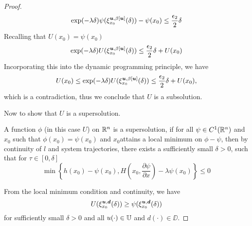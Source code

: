 \begin{for_journal}
\begin{proof}
%
\begin{equation}
\exp(-\lambda \delta)\psi(\xi_{x_0}^{\bm{u},\beta[\bm{u}]}(\delta))-\psi(x_0) \leq \frac{\epsilon_2}{2} \delta
\end{equation}
%
Recalling that $U(x_0)=\psi(x_0)$
%
\begin{equation}
\exp(-\lambda \delta)U(\xi_{x_0}^{\bm{u},\beta[\bm{u}]}(\delta)) \leq \frac{\epsilon_2}{2} \delta + U(x_0)
\end{equation}
%
Incorporating this into the dynamic programming principle, we have
%
\begin{equation}
U(x_0) \leq \exp(-\lambda \delta)U(\xi_{x_0}^{\bm{u},\beta[\bm{u}]}(\delta)) \leq \frac{\epsilon_2}{2} \delta + U(x_0),
\end{equation}
%
which is a contradiction, thus we conclude that $U$ is a subsolution.


Now to show that $U$ is a supersolution. 

\begin{definition} A function $\phi$ (in this case $U$) on $\mathbb{R}^n$  is a supersolution, if for all $\psi \in C^1(\mathbb{R}^n)$ and $x_0$ such that $\phi(x_0) = \psi(x_0)$ and $x_0$attains a local minimum on $\phi- \psi$, then by continuity of $l$ and system trajectories, there exists a sufficiently small $\delta>0$, such that for $\tau \in [0, \delta]$
%
\begin{equation}\label{eq:sup_sol}
    \min\left\{h(x_0)-\psi(x_0), H(x_0,\frac{\partial \psi}{\partial x}) - \lambda \psi(x_0)\right\} \leq 0
\end{equation}
%
\end{definition}

From the local minimum condition and continuity, we have
%
\begin{equation*}
U(\xi_{x_0}^{\bm{u}, \bm{d}}(\delta)) \geq \psi(\xi_{x_0}^{\bm{u}, \bm{d}}(\delta))
\end{equation*}
%
for sufficiently small $\delta>0$ and all $u(\cdot) \in \mathbb{U}$ and $d(\cdot) \in \DD$.


\end{proof}
\end{for_journal}

